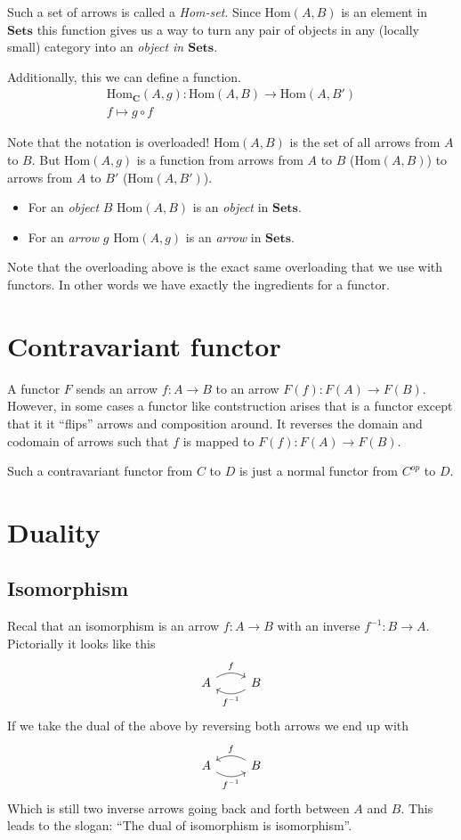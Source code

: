 \documentclass{book}
\theoremstyle{definition}
\newcommand\Hom{\text{Hom}}
\begin{document}
Such a set of arrows is called a \emph{Hom-set}. Since $\Hom(A, B)$ is an
element in $\mathbf{Sets}$ this function gives us a way to turn any pair of
objects in any (locally small) category into an \emph{object in
  $\mathbf{Sets}$}.

Additionally, this we can define a function.
\begin{gather*}
  \Hom_{\mathbf{C}}(A, g) : \Hom(A, B) \to \Hom(A, B') \\
  f \mapsto g \circ f
\end{gather*}

Note that the notation is overloaded! $\Hom(A, B)$ is the set of all arrows from
$A$ to $B$. But $\Hom(A, g)$ is a function from arrows from $A$ to $B$
($\Hom(A, B)$) to arrows from $A$ to $B'$ ($\Hom(A, B')$).
\begin{itemize}
\item For an \emph{object} $B$ $\Hom(A, B)$ is an \emph{object} in $\mathbf{Sets}$.
\item For an \emph{arrow} $g$ $\Hom(A, g)$ is an \emph{arrow} in $\mathbf{Sets}$.
\end{itemize}
Note that the overloading above is the exact same overloading that we use with
functors. In other words we have exactly the ingredients for a functor.

\section{Contravariant functor}

A functor $F$ sends an arrow $f : A \to B$ to an arrow $F(f) : F(A) \to F(B)$.
However, in some cases a functor like contstruction arises that is a functor
except that it it ``flips'' arrows and composition around. It reverses the
domain and codomain of arrows such that $f$ is mapped to $F(f) : F(A) \to F(B)$.

Such a contravariant functor from $C$ to $D$ is just a normal functor from
$C^{op}$ to $D$.

\section{Duality}

\subsection{Isomorphism}

Recal that an isomorphism is an arrow $f : A \to B$ with an inverse
$f^{-1} : B \to A$. Pictorially it looks like this
\[
  \begin{tikzcd}
    A \ar[r, bend left, "f"] & B \ar[l, bend left, "f^{-1}"]
  \end{tikzcd}
\]
If we take the dual of the above by reversing both arrows we end up with
\[
  \begin{tikzcd}
    A \ar[r, bend right, "f^{-1}"'] & B \ar[l, bend right, "f"']
  \end{tikzcd}
\]
Which is still two inverse arrows going back and forth between $A$ and $B$. This
leads to the slogan: ``The dual of isomorphism is isomorphism''.
\end{document}
